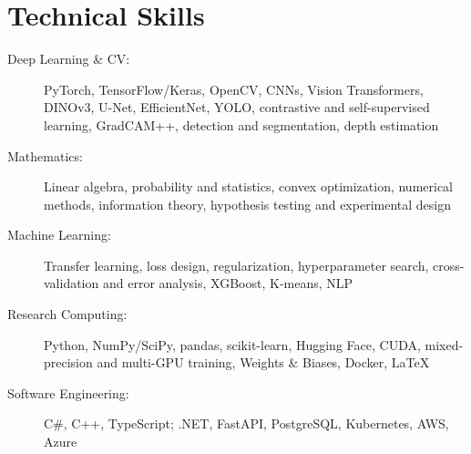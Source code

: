 \documentclass[letterpaper,11pt]{article}
\begin{document}
\section{Technical Skills}
\begin{description}
    \item[Deep Learning \& CV:] PyTorch, TensorFlow/Keras, OpenCV, CNNs, Vision Transformers, DINOv3, U-Net, EfficientNet, YOLO, contrastive and self-supervised learning, GradCAM++, detection and segmentation, depth estimation
    \item[Mathematics:] Linear algebra, probability and statistics, convex optimization, numerical methods, information theory, hypothesis testing and experimental design
    \item[Machine Learning:] Transfer learning, loss design, regularization, hyperparameter search, cross-validation and error analysis, XGBoost, K-means, NLP
    \item[Research Computing:] Python, NumPy/SciPy, pandas, scikit-learn, Hugging Face, CUDA, mixed-precision and multi-GPU training, Weights \& Biases, Docker, LaTeX
    \item[Software Engineering:] C\#, C++, TypeScript; .NET, FastAPI, PostgreSQL, Kubernetes, AWS, Azure
\end{description}
\end{document}
